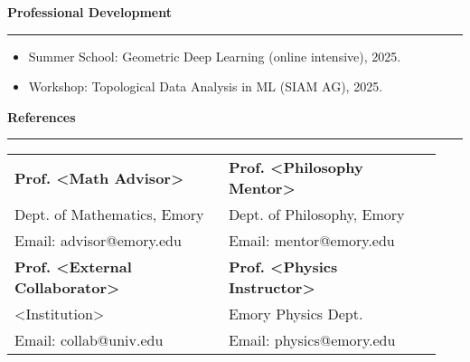 \documentclass[11pt]{article}
\newcommand{\cvsection}[1]{%
  \vspace{1.25em}%
  \textbf{\large #1}%
  \vspace{0.5em}\hrule\vspace{0.6em}
}
\newenvironment{cvitems}{\begin{itemize}[leftmargin=*,topsep=2pt,itemsep=2pt]}{\end{itemize}}
\begin{document}
\cvsection{Professional Development}
\begin{cvitems}
  \item Summer School: Geometric Deep Learning (online intensive), 2025.
  \item Workshop: Topological Data Analysis in ML (SIAM AG), 2025.
\end{cvitems}

\cvsection{References}
\begin{tabular}{@{}p{0.47\linewidth}p{0.47\linewidth}@{}}
\textbf{Prof. <Math Advisor>} & \textbf{Prof. <Philosophy Mentor>}\\
Dept. of Mathematics, Emory & Dept. of Philosophy, Emory \\
Email: advisor@emory.edu & Email: mentor@emory.edu \\[0.5em]
\textbf{Prof. <External Collaborator>} & \textbf{Prof. <Physics Instructor>}\\
<Institution> & Emory Physics Dept. \\
Email: collab@univ.edu & Email: physics@emory.edu
\end{tabular}
\end{document}
